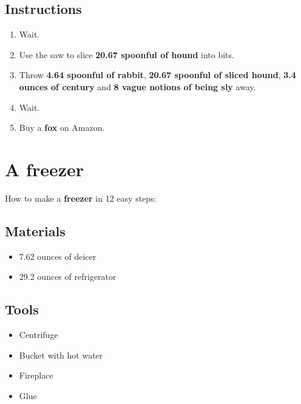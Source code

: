 \documentclass{article}
\begin{document}
\subsection{Instructions}\begin{enumerate}
\item 
Wait.
\item 
Use the saw to slice \textbf{20.67 spoonful of hound} into bits.
\item 
Throw \textbf{4.64 spoonful of rabbit}, \textbf{20.67 spoonful of sliced hound}, \textbf{3.4 ounces of century} and \textbf{8 vague notions of being sly} away.
\item 
Wait.
\item 
Buy a \textbf{fox} on Amazon.
\end{enumerate}
\newpage
\section{A freezer}How to make a \textbf{freezer} in 12 easy steps:

\subsection{Materials}\begin{itemize}
\item 
7.62 ounces of deicer
\item 
29.2 ounces of refrigerator
\end{itemize}
\subsection{Tools}\begin{itemize}
\item 
Centrifuge
\item 
Bucket with hot water
\item 
Fireplace
\item 
Glue
\end{itemize}
\end{document}
